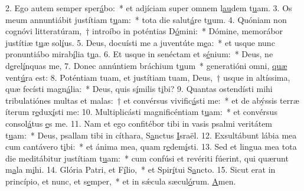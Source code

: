 2. Ego autem semper sper\uline{á}bo:~* et adjíciam super omnem l\uline{au}dem t\uline{u}am.
3. Os meum annuntiábit justítiam t\uline{u}am:~* tota die salut\uline{á}re t\uline{u}um.
4. Quóniam non cognóvi litteratúram,~† introíbo in poténtias D\uline{ó}mini:~* Dómine, memorábor justítiæ t\uline{u}æ sol\uline{í}us.
5. Deus, docuísti me a juventúte m\uline{e}a:~* et usque nunc pronuntiábo mirab\uline{í}lia t\uline{u}a.
6. Et usque in senéctam et s\uline{é}nium:~* Deus, ne d\uline{e}rel\uline{í}nquas me,
7. Donec annúntiem bráchium t\uline{u}um~* generatióni omni, \uline{quæ} vent\uline{ú}ra est:
8. Poténtiam tuam, et justítiam tuam, Deus,~† usque in altíssima, quæ fecísti magn\uline{á}lia:~* Deus, quis s\uline{í}milis t\uline{i}bi?
9. Quantas ostendísti mihi tribulatiónes multas et malas:~† et convérsus vivific\uline{á}sti me:~* et de abýssis terræ íterum r\uline{e}dux\uline{í}sti me:
10. Multiplicásti magnificéntiam t\uline{u}am:~* et convérsus consol\uline{á}tus \uline{e}s me.
11. Nam et ego confitébor tibi in vasis psalmi veritátem t\uline{u}am:~* Deus, psallam tibi in cíthara, S\uline{a}nctus \uline{I}sraël.
12. Exsultábunt lábia mea cum cantávero t\uline{i}bi:~* et ánima mea, quam r\uline{e}dem\uline{í}sti.
13. Sed et lingua mea tota die meditábitur justítiam t\uline{u}am:~* cum confúsi et revériti fúerint, qui quærunt m\uline{a}la m\uline{i}hi.
14. Glória Patri, et F\uline{í}lio,~* et Spir\uline{í}tui S\uline{a}ncto.
15. Sicut erat in princípio, et nunc, et s\uline{e}mper,~* et in sǽcula sæcul\uline{ó}rum. \uline{A}men.
